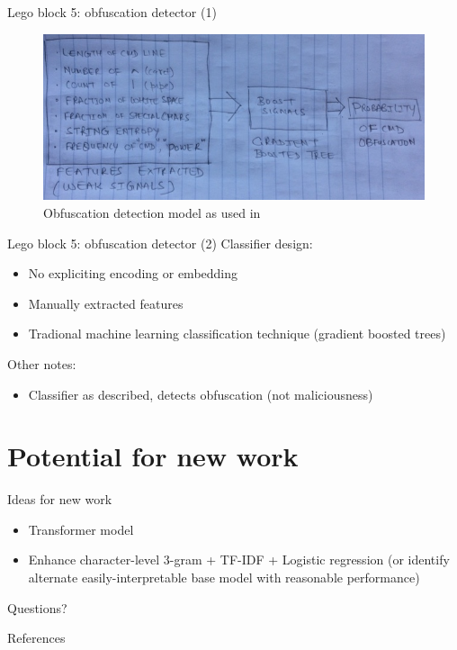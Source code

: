 \documentclass[10pt]{beamer}
\begin{document}
\begin{frame}{Lego block 5: obfuscation detector (1)}
	\begin{figure}
		\includegraphics[scale=0.50]{gbtree}
		\caption{Obfuscation detection model as used in \cite{feye2018}}
	\end{figure}
\end{frame}

\begin{frame}{Lego block 5: obfuscation detector (2)}
	Classifier design:
	\begin{itemize}
		\item No expliciting encoding or embedding
		\item Manually extracted features
		\item Tradional machine learning classification technique (gradient boosted trees)
	\end{itemize}
	Other notes:
	\begin{itemize}
		\item Classifier as described, detects obfuscation (not maliciousness)
	\end{itemize}
\end{frame}

\section{Potential for new work}

\begin{frame}[fragile]{Ideas for new work}
	\begin{itemize}
		\item Transformer model \cite{transformers2019}
		\item Enhance character-level 3-gram + TF-IDF + Logistic regression (or identify alternate easily-interpretable base model with reasonable performance)
	\end{itemize}
\end{frame}

\begin{frame}[standout]
  Questions?
\end{frame}

\appendix

\begin{frame}[allowframebreaks]{References}

  
  

\end{frame}
\end{document}
